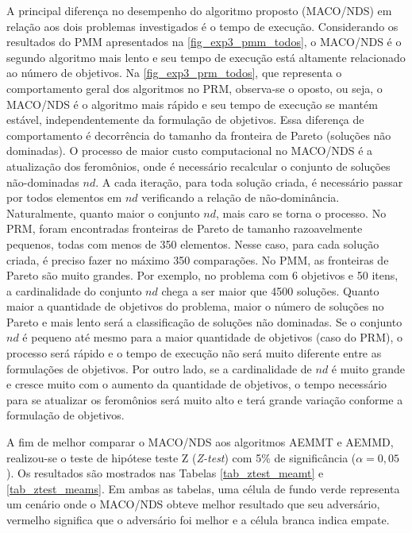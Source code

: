 A principal diferença no desempenho do algoritmo proposto (MACO/NDS) em relação aos dois problemas investigados é o tempo de execução. Considerando os resultados do PMM apresentados na \autoref{fig_exp3_pmm_todos}, o MACO/NDS é o segundo algoritmo mais lento e seu tempo de execução está altamente relacionado ao número de objetivos. Na \autoref{fig_exp3_prm_todos}, que representa o comportamento geral dos algoritmos no PRM, observa-se o oposto, ou seja, o MACO/NDS é o algoritmo mais rápido e seu tempo de execução se mantém estável, independentemente da formulação de objetivos. Essa diferença de comportamento é decorrência do tamanho da fronteira de Pareto (soluções não dominadas). O processo de maior custo computacional no MACO/NDS é a atualização dos feromônios, onde é necessário recalcular o conjunto de soluções não-dominadas $nd$. A cada iteração, para toda solução criada, é necessário passar por todos elementos em $nd$ verificando a relação de não-dominância. Naturalmente, quanto maior o conjunto $nd$, mais caro se torna o processo. No PRM, foram encontradas fronteiras de Pareto de tamanho razoavelmente pequenos, todas com menos de 350 elementos. Nesse caso, para cada solução criada, é preciso fazer no máximo 350 comparações. No PMM, as fronteiras de Pareto são muito grandes. Por exemplo, no problema com 6 objetivos e 50 itens, a cardinalidade do conjunto $nd$ chega a ser maior que 4500 soluções. Quanto maior a quantidade de objetivos do problema, maior o número de soluções no Pareto e mais lento será a classificação de soluções não dominadas. Se o conjunto $nd$ é pequeno até mesmo para a maior quantidade de objetivos (caso do PRM), o processo será rápido e o tempo de execução não será muito diferente entre as formulações de objetivos. Por outro lado, se a cardinalidade de $nd$ é muito grande e cresce muito com o aumento da quantidade de objetivos, o tempo necessário para se atualizar os feromônios será muito alto e terá grande variação conforme a formulação de objetivos.

A fim de melhor comparar o MACO/NDS aos algoritmos AEMMT e AEMMD, realizou-se o teste de hipótese teste Z (\textit{Z-test}) com 5\% de significância ($\alpha=0,05$). Os resultados são mostrados nas Tabelas \ref{tab_ztest_meamt} e \ref{tab_ztest_meams}. Em ambas as tabelas, uma célula de fundo verde representa um cenário onde o MACO/NDS obteve melhor resultado que seu adversário, vermelho significa que o adversário foi melhor e a célula branca indica empate.

